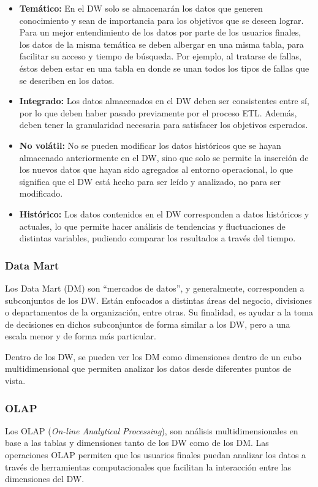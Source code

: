 \documentclass[letter,12pt,oneside]{report}
\begin{document}
\begin{itemize}
\item\textbf{Temático: }En el DW solo se almacenarán los datos que generen conocimiento y sean de importancia para los objetivos que se deseen lograr. Para un mejor entendimiento de los datos por parte de los usuarios finales, los datos de la misma temática se deben albergar en una misma tabla, para facilitar su acceso y tiempo de búsqueda. Por ejemplo, al tratarse de fallas, éstos deben estar en una tabla en donde se unan todos los tipos de fallas que se describen en los datos.
\item\textbf{Integrado: }Los datos almacenados en el DW deben ser consistentes entre sí, por lo que deben haber pasado previamente por el proceso ETL. Además, deben tener la granularidad necesaria para satisfacer los objetivos esperados.
\item\textbf{No volátil: }No se pueden modificar los datos históricos que se hayan almacenado anteriormente en el DW, sino que solo se permite la inserción de los nuevos datos que hayan sido agregados al entorno operacional, lo que significa que el DW está hecho para ser leído y analizado, no para ser modificado.
\item\textbf{Histórico: }Los datos contenidos en el DW corresponden a datos históricos y actuales, lo que permite hacer análisis de tendencias y fluctuaciones de distintas variables, pudiendo comparar los resultados a través del tiempo. 
\end{itemize}

\subsubsection{Data Mart}
Los Data Mart (DM) son ``mercados de datos”, y generalmente, corresponden a subconjuntos de los DW. Están enfocados a distintas áreas del negocio, divisiones o departamentos de la organización, entre otras. Su finalidad, es ayudar a la toma de decisiones en dichos subconjuntos de forma similar a los DW, pero a una escala menor y de forma más particular.

Dentro de los DW, se pueden ver los DM como dimensiones dentro de un cubo multidimensional que permiten analizar los datos desde diferentes puntos de vista.

\subsubsection{OLAP}
Los OLAP (\textit{On-line Analytical Processing}), son análisis multidimensionales en base a las tablas y dimensiones tanto de los DW como de los DM. Las operaciones OLAP permiten que los usuarios finales puedan analizar los datos a través de herramientas computacionales que facilitan la interacción entre las dimensiones del DW. 
\end{document}
